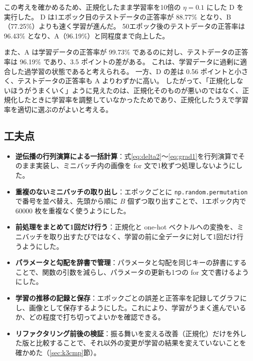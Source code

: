 \documentclass[a4paper,11pt]{ltjsarticle}
\begin{document}
この考えを確かめるため、正規化したまま学習率を10倍の $\eta = 0.1$ にした D を実行した。
D は1エポック目のテストデータの正答率が 88.77\% となり、B（77.25\%）よりも速く学習が進んだ。
50エポック後のテストデータの正答率は 96.43\% となり、A（96.19\%）と同程度まで向上した。

また、A は学習データの正答率が 99.73\% であるのに対し、テストデータの正答率は 96.19\% であり、3.5 ポイントの差がある。
これは、学習データに過剰に適合した過学習の状態であると考えられる。
一方、D の差は 0.56 ポイントと小さく、テストデータの正答率も A よりわずかに高い。
したがって、「正規化しないほうがうまくいく」ように見えたのは、正規化そのものが悪いのではなく、正規化したときに学習率を調整していなかったためであり、正規化したうえで学習率を適切に選ぶのがよいと考える。

\subsection{工夫点}
\begin{itemize}
  \item \textbf{逆伝播の行列演算による一括計算}：式\eqref{eq:delta2}～\eqref{eq:grad1}を行列演算でそのまま実装し、ミニバッチ内の画像を for 文で1枚ずつ処理しないようにした。
  \item \textbf{重複のないミニバッチの取り出し}：エポックごとに \texttt{np.random.permutation} で番号を並べ替え、先頭から順に $B$ 個ずつ取り出すことで、1エポック内で 60000 枚を重複なく使うようにした。
  \item \textbf{前処理をまとめて1回だけ行う}：正規化と one-hot ベクトルへの変換を、ミニバッチを取り出すたびではなく、学習の前に全データに対して1回だけ行うようにした。
  \item \textbf{パラメータと勾配を辞書で管理}：パラメータと勾配を同じキーの辞書にすることで、関数の引数を減らし、パラメータの更新も1つの for 文で書けるようにした。
  \item \textbf{学習の推移の記録と保存}：エポックごとの誤差と正答率を記録してグラフにし、画像として保存するようにした。これにより、学習がうまく進んでいるか、どの程度で打ち切ってよいかを確認できる。
  \item \textbf{リファクタリング前後の検証}：振る舞いを変える改善（正規化）だけを外した版と比較することで、それ以外の変更が学習の結果を変えていないことを確かめた（\ref{sec:k3cmp}節）。
\end{itemize}
\end{document}
